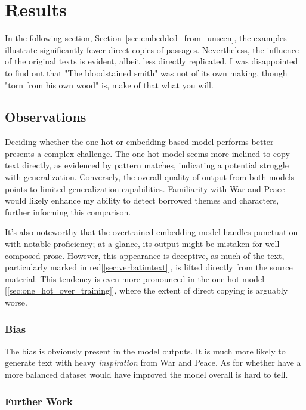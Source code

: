 \documentclass[12pt]{article} \usepackage{COSC420style} \usepackage{soul}
\begin{document}
\section{Results}

In the following section, Section~\ref{sec:embedded_from_unseen}, the examples
illustrate significantly fewer direct copies of passages. Nevertheless, the
influence of the original texts is evident, albeit less directly replicated. I was disappointed to
find out that "The bloodstained smith" was not of its own making, though "torn
from his own wood" is, make of that what you will.

\subsection{Observations}

Deciding whether the one-hot or embedding-based model performs better presents a
complex challenge. The one-hot model seems more inclined to copy text directly,
as evidenced by pattern matches, indicating a potential struggle with
generalization. Conversely, the overall quality of output from both models
points to limited generalization capabilities. Familiarity with War and Peace
would likely enhance my ability to detect borrowed themes and characters,
further informing this comparison.

It’s also noteworthy that the overtrained embedding model handles punctuation
with notable proficiency; at a glance, its output might be mistaken for
well-composed prose. However, this appearance is deceptive, as much of the text,
particularly marked in red[\ref{sec:verbatimtext}], is lifted directly from the source material. This
tendency is even more pronounced in the one-hot model
	[\ref{sec:one_hot_over_training}], where the extent of
direct copying is arguably worse.

\subsubsection*{Bias}

The bias is obviously present in the model outputs. It is much more likely to
generate text with heavy \textit{inspiration} from War and Peace. As for whether
have a more balanced dataset would have improved the model overall is hard to
tell.

\subsubsection*{Further Work}
\end{document}
